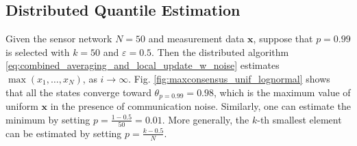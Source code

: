 \documentclass[journal]{IEEEtran}
\begin{document}

%


\vspace{-2mm}
\subsection{Distributed Quantile Estimation}
Given the sensor network $N=50$ and measurement data $\mathbf{x}$, suppose that $p=0.99$ is selected with $k=50$ and $\varepsilon=0.5$. Then the distributed algorithm \eqref{eq:combined_averaging_and_local_update_w_noise} estimates $\max(x_1,\ldots,x_N)$, as $i \to \infty$. Fig. \ref{fig:maxconsensus_unif_lognormal} shows that all the states converge toward $\theta_{p=0.99} = 0.98$, which is the maximum value of uniform $\mathbf{x}$ in the presence of communication noise. Similarly, one can estimate the minimum by setting $p=\frac{1-0.5}{50} = 0.01$. More generally, the $k$-th smallest element can be estimated by setting $p = \frac{k-0.5}{N}$.
\end{document}
